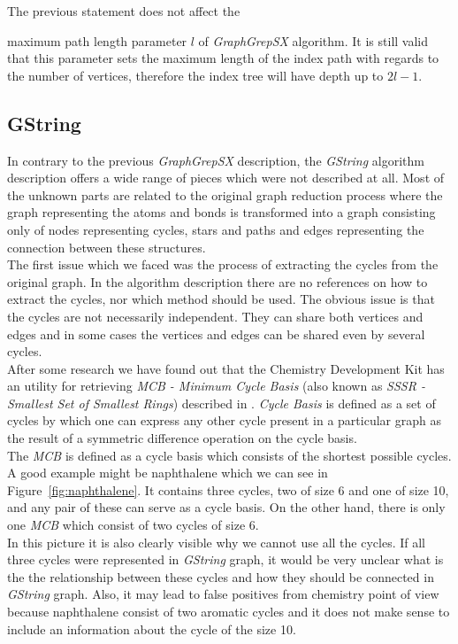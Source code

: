 The previous statement does not affect the {maximum path length parameter $l$ of \textit{GraphGrepSX} algorithm. It is still valid that this parameter sets the maximum length of the index path with regards to the number of vertices, therefore the index tree will have depth up to $2l - 1$.

\subsection{GString}

In contrary to the previous \textit{GraphGrepSX} description, the \textit{GString} algorithm description offers a wide range of pieces which were not described at all. Most of the unknown parts are related to the original graph reduction process where the graph representing the atoms and bonds is transformed into a graph consisting only of nodes representing cycles, stars and paths and edges representing the connection between these structures.\\

The first issue which we faced was the process of extracting the cycles from the original graph. In the algorithm description there are no references on how to extract the cycles, nor which method should be used. The obvious issue is that the cycles are not necessarily independent. They can share both vertices and edges and in some cases the vertices and edges can be shared even by several cycles.\\

After some research we have found out that the Chemistry Development Kit has an utility for retrieving \textit{MCB - Minimum Cycle Basis} (also known as \textit{SSSR - Smallest Set of Smallest Rings}) described in \cite{Bauer}. \textit{Cycle Basis} is defined as a set of cycles by which one can express any other cycle present in a particular graph as the result of a symmetric difference operation on the cycle basis.\\

The \textit{MCB} is defined as a cycle basis which consists of the shortest possible cycles. A good example might be naphthalene which we can see in Figure~\ref{fig:naphthalene}. It contains three cycles, two of size 6 and one of size 10, and any pair of these can serve as a cycle basis. On the other hand, there is only one \textit{MCB} which consist of two cycles of size 6.\\

In this picture it is also clearly visible why we cannot use all the cycles. If all three cycles were represented in \textit{GString} graph, it would be very unclear what is the the relationship between these cycles and how they should be connected in \textit{GString} graph. Also, it may lead to false positives from chemistry point of view because naphthalene consist of two aromatic cycles and it does not make sense to include an information about the cycle of the size 10.

}
